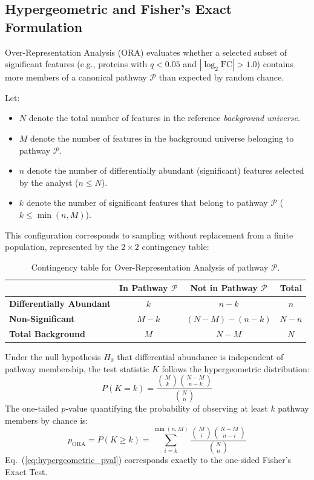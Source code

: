 \documentclass[11pt,oneside]{book}
\begin{document}
\subsection{Hypergeometric and Fisher's Exact Formulation}

Over-Representation Analysis (ORA) evaluates whether a selected subset of significant features (e.g., proteins with $q < 0.05$ and $|\log_2 \text{FC}| > 1.0$) contains more members of a canonical pathway $\mathcal{P}$ than expected by random chance.

Let:
\begin{itemize}
    \item $N$ denote the total number of features in the reference \textit{background universe}.
    \item $M$ denote the number of features in the background universe belonging to pathway $\mathcal{P}$.
    \item $n$ denote the number of differentially abundant (significant) features selected by the analyst ($n \le N$).
    \item $k$ denote the number of significant features that belong to pathway $\mathcal{P}$ ($k \le \min(n, M)$).
\end{itemize}

This configuration corresponds to sampling without replacement from a finite population, represented by the $2 \times 2$ contingency table:

\begin{table}[htbp]
\centering
\small
\caption{Contingency table for Over-Representation Analysis of pathway $\mathcal{P}$.}
\label{tab:ora_contingency}
\begin{tabular}{lccc}
\toprule
 & \textbf{In Pathway $\mathcal{P}$} & \textbf{Not in Pathway $\mathcal{P}$} & \textbf{Total} \\
\midrule
\textbf{Differentially Abundant} & $k$ & $n - k$ & $n$ \\
\textbf{Non-Significant} & $M - k$ & $(N - M) - (n - k)$ & $N - n$ \\
\midrule
\textbf{Total Background} & $M$ & $N - M$ & $N$ \\
\bottomrule
\end{tabular}
\end{table}

Under the null hypothesis $H_0$ that differential abundance is independent of pathway membership, the test statistic $K$ follows the hypergeometric distribution:
\begin{equation}
\label{eq:hypergeometric_pmf}
P(K = k) = \frac{\binom{M}{k} \binom{N - M}{n - k}}{\binom{N}{n}}
\end{equation}
The one-tailed $p$-value quantifying the probability of observing at least $k$ pathway members by chance is:
\begin{equation}
\label{eq:hypergeometric_pval}
p_{\text{ORA}} = P(K \ge k) = \sum_{i=k}^{\min(n, M)} \frac{\binom{M}{i} \binom{N - M}{n - i}}{\binom{N}{n}}
\end{equation}
Eq.~(\ref{eq:hypergeometric_pval}) corresponds exactly to the one-sided Fisher's Exact Test.
\end{document}

